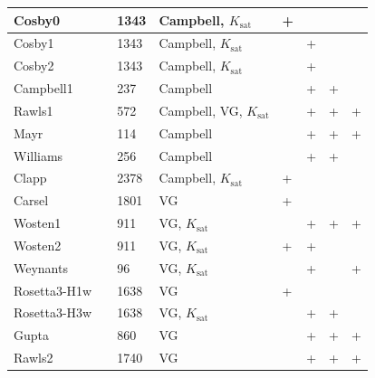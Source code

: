 \begin{landscape}
\begin{ThreePartTable}
\begin{center}
\begin{longtable}{p{2cm}<{\centering}p{4cm}<{\centering}p{2cm}<{\centering}p{2.8cm}<{\centering}p{2cm}<{\centering}p{2cm}<{\centering}p{2cm}<{\centering}p{2cm}<{\centering}}
        Cosby0       & \citet{cosby1984statistical}    & 1343 & Campbell, $K_{\mathrm {sat}} $     & + &   &   &   \\ \hline
        Cosby1       & \citet{cosby1984statistical}    & 1343 & Campbell, $K_{\mathrm {sat}} $     &   & + &   &   \\ \hline
        Cosby2       & \citet{cosby1984statistical}    & 1343 & Campbell, $K_{\mathrm {sat}} $     &   & + &   &   \\ \hline
        Campbell1    & \citet{campbell_Shiozawa_1992}  & 237  & Campbell                           &   & + & + &   \\ \hline
        Rawls1       & \citet{Rawls_Brakensiek_1989}   & 572  & Campbell, VG, $K_{\mathrm {sat}} $ &   & + & + & + \\ \hline
        Mayr         & \citet{Mayr_Jarvis_1999}        & 114  & Campbell                           &   & + & + & + \\ \hline
        Williams     & \citet{Williams_Ross_1992}      & 256  & Campbell                           &   & + & + &   \\ \hline
        Clapp        & \citet{clapp1978empirical}      & 2378 & Campbell, $K_{\mathrm {sat}} $     & + &   &   &   \\ \hline
        Carsel       & \citet{Carsel_Parrish_1988}     & 1801 & VG                                 & + &   &   &   \\ \hline
        Wosten1      & \citet{Wösten_Lilly_1999}       & 911  & VG, $K_{\mathrm {sat}} $           &   & + & + & + \\ \hline
        Wosten2      & \citet{Wösten_Lilly_1999}       & 911  & VG, $K_{\mathrm {sat}} $           & + & + &   &   \\ \hline
        Weynants     & \citet{Weynants_Vereecken_2009} & 96   & VG, $K_{\mathrm {sat}} $           &   & + &   & + \\ \hline
        Rosetta3-H1w & \citet{Zhang_Schaap_2017}       & 1638 & VG                                 & + &   &   &   \\ \hline
        Rosetta3-H3w & \citet{Zhang_Schaap_2017}       & 1638 & VG, $K_{\mathrm {sat}} $           &   & + & + &   \\ \hline
        Gupta        & \citet{Gupta_Larson_1979}       & 860  & VG                                 &   & + & + & + \\ \hline
        Rawls2       & \citet{Rawls_Brakensiek_1982}   & 1740 & VG                                 &   & + & + & + \\ \hline

\end{longtable}
\end{center}
\end{ThreePartTable}
\end{landscape}
